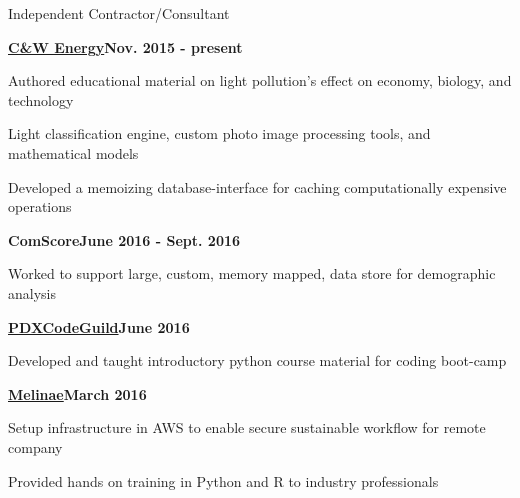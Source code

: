 \documentclass{article}
\newenvironment{**mylist}[2]{
  \subsubsection*{#1\hfill\small#2}
  \small
  \begin{list}{}{}
   \setlength{\topsep}{0pt}
   \setlength{\itemsep}{1pt}
   \setlength{\parskip}{0pt}
   \setlength{\parsep}{0pt}}{\end{list}\normalsize}
\newcommand{\LU}[1]{\hspace{-1em}{\bf Languages Used : #1}}
\begin{document}
\begin{**mylist}{Independent \tabb Contractor/Consultant}{}
\item \hspace{-1em}
  \href{http://cwenergyusa.com/star-friendly/}{\bf{C\&W Energy}}\hfill{\bf{Nov. 2015 - present}}
\item Authored educational material on light pollution's effect on economy, biology, and technology
\item Light classification engine, custom photo image processing tools, and mathematical models
\item Developed a memoizing database-interface for caching computationally expensive operations
\item \hspace{-1em}
  {\bf{ComScore}}\hfill{\bf{June 2016 - Sept. 2016}}
\item Worked to support large, custom, memory mapped, data store for demographic analysis
\item \hspace{-1em}
  \href{http://pdxcodeguild.com/}{\bf{PDXCodeGuild}}\hfill{\bf{June 2016}}
\item Developed and taught introductory python course material for coding boot-camp
\item \hspace{-1em}
  \href{http://www.melinae.com/}{\bf{Melinae}}\hfill{\bf{March 2016}}
\item Setup infrastructure in AWS to enable secure sustainable workflow for remote company
\item Provided hands on training in Python and R to industry professionals
\item \LU{Python, R, AWS, PostgreSQL, Perl, C++}
\end{**mylist}
\end{document}
